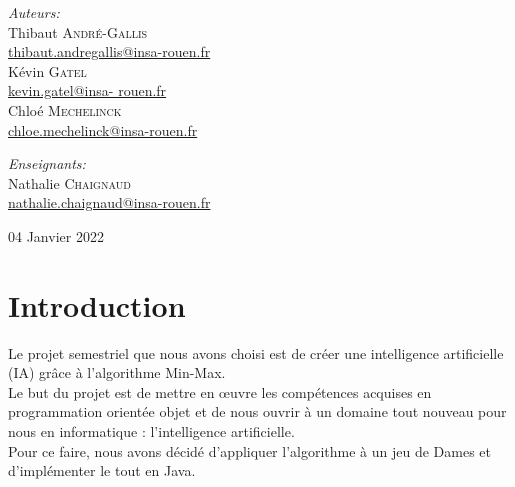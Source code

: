 \documentclass[12,french]{report}
\begin{document}
\begin{titlepage}
\begin{center}
	\begin{minipage}{0.4\textwidth}
		\begin{flushleft} \large
			\emph{Auteurs:}\\
			Thibaut \textsc{André-Gallis} \\
			{\small\href{mailto:thibaut.andregallis@insa-rouen.fr}{thibaut.andregallis@insa-rouen.fr}} \\
			Kévin \textsc{Gatel} \\
			{\small\href{mailto:kevin.gatel@insa-rouen.fr}{kevin.gatel@insa-				rouen.fr}}\\
			Chloé \textsc{Mechelinck} \\
			{\small\href{mailto:chloe.mechelinck@insa-rouen.fr}{chloe.mechelinck@insa-rouen.fr}}
		\end{flushleft}
	\end{minipage}
	\begin{minipage}{0.4\textwidth}
		\begin{flushright} \large
			\emph{Enseignants:} \\
			Nathalie \textsc{Chaignaud} \\
			{\small\href{mailto:nathalie.chaignaud@insa-rouen.fr}								{nathalie.chaignaud@insa-rouen.fr}}\\
		\end{flushright}
	\end{minipage}

	\vfill
	{\large 04 Janvier 2022}
\end{center}
\end{titlepage}

\tableofcontents

\renewcommand{\chaptername}{}

\chapter*{Introduction}

Le projet semestriel que nous avons choisi est de créer une intelligence artificielle (IA) grâce à l'algorithme Min-Max. \\

Le but du projet est de mettre en œuvre les compétences acquises en programmation orientée objet et de nous ouvrir à un domaine tout nouveau pour nous en informatique : l'intelligence artificielle.\\

Pour ce faire, nous avons décidé d'appliquer l'algorithme à un jeu de Dames et d'implémenter le tout en Java.\\
\end{document}
